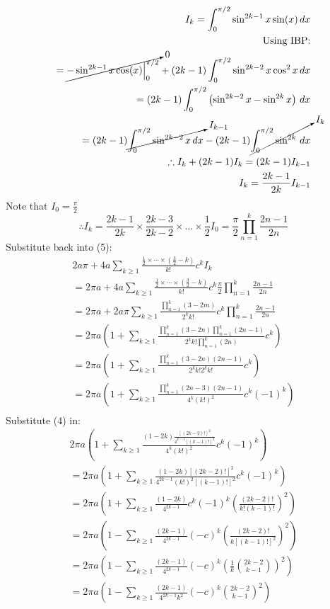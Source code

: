 \documentclass{article}
\begin{document}
\begin{equation*}
\begin{split}
	I_k = \int_{0}^{\pi/2}\sin^{2k-1}x\sin(x)\,dx\\
	\text{Using IBP:}\\
	= \cancelto{0}{-\sin^{2k-1}x\cos(x)\Big|_0^{\pi/2}} + (2k-1)\int_0^{\pi/2}\sin^{2k-2}x\cos^2x\,dx\\
	= (2k-1)\int_0^{\pi/2}\left(\sin^{2k-2}x - \sin^{2k}x\right)\,dx\\
	= (2k-1)\cancelto{I_{k-1}}{\int_0^{\pi/2}\sin^{2k-2}x\,dx} - (2k-1)\cancelto{I_k}{\int_0^{\pi/2}\sin^{2k}\,dx}\\
	\therefore I_k + (2k-1)I_k = (2k-1)I_{k-1}\\
	I_k = \frac{2k-1}{2k}I_{k-1}
\end{split}
\end{equation*}
Note that $I_0=\frac{\pi}{2}$
\[\therefore I_k = \frac{2k-1}{2k}\times\frac{2k-3}{2k-2}\times\dots\times\frac{1}{2}I_0 = \frac{\pi}{2}\prod_{n=1}^k\frac{2n-1}{2n}\]
Substitute back into (5):
\begin{equation*}
\begin{split}
	2a\pi+4a\sum_{k\geq 1}\frac{\frac{1}{2}\times\cdots\times(\frac{3}{2}-k)}{k!}c^kI_k\\
	= 2\pi a+4a\sum_{k\geq 1}\frac{\frac{1}{2}\times\cdots\times(\frac{3}{2}-k)}{k!}c^k\frac{\pi}{2}\prod_{n=1}^k\frac{2n-1}{2n}\\
	= 2\pi a+2a\pi\sum_{k\geq 1}\frac{\prod_{n=1}^k(3-2m)}{2^kk!}c^k\prod_{n=1}^k\frac{2n-1}{2n}\\
	= 2\pi a\left(1+\sum_{k\geq 1}\frac{\prod_{n=1}^k(3-2n)\prod_{n=1}^k(2n-1)}{2^kk!\prod_{n=1}^k(2n)}c^k\right)\\
	= 2\pi a\left(1+\sum_{k\geq 1}\frac{\prod_{n=1}^k(3-2n)(2n-1)}{2^kk!2^kk!}c^k\right)\\
	= 2\pi a\left(1+\sum_{k\geq 1}\frac{\prod_{n=1}^k(2n-3)(2n-1)}{4^k(k!)^2}c^k(-1)^k\right)\\
\end{split}
\end{equation*}
Substitute (4) in:
\begin{equation*}
\begin{split}
	2\pi a\left(1+\sum_{k\geq 1}\frac{(1-2k)\frac{[(2k-2)!]^2}{4^{k-1}[(k-1)!]^2}}{4^k(k!)^2}c^k(-1)^k\right)\\
	= 2\pi a\left(1+\sum_{k\geq 1}\frac{(1-2k)[(2k-2)!]^2}{4^{2k-1}(k!)^2[(k-1)!]^2}c^k(-1)^k\right)\\
	= 2\pi a\left(1+\sum_{k\geq 1}\frac{(1-2k)}{4^{2k-1}}c^k(-1)^k\left(\frac{(2k-2)!}{k!(k-1)!}\right)^2\right)\\
	= 2\pi a\left(1-\sum_{k\geq 1}\frac{(2k-1)}{4^{2k-1}}(-c)^k\left(\frac{(2k-2)!}{k[(k-1)!]^2}\right)^2\right)\\
	= 2\pi a\left(1-\sum_{k\geq 1}\frac{(2k-1)}{4^{2k-1}}(-c)^k\left(\frac{1}{k}{{2k-2}\choose{k-1}}\right)^2\right)\\
	= 2\pi a\left(1-\sum_{k\geq 1}\frac{(2k-1)}{4^{2k-1}k^2}(-c)^k{{2k-2}\choose{k-1}}^2\right)\\
\end{split}
\end{equation*}
\end{document}
